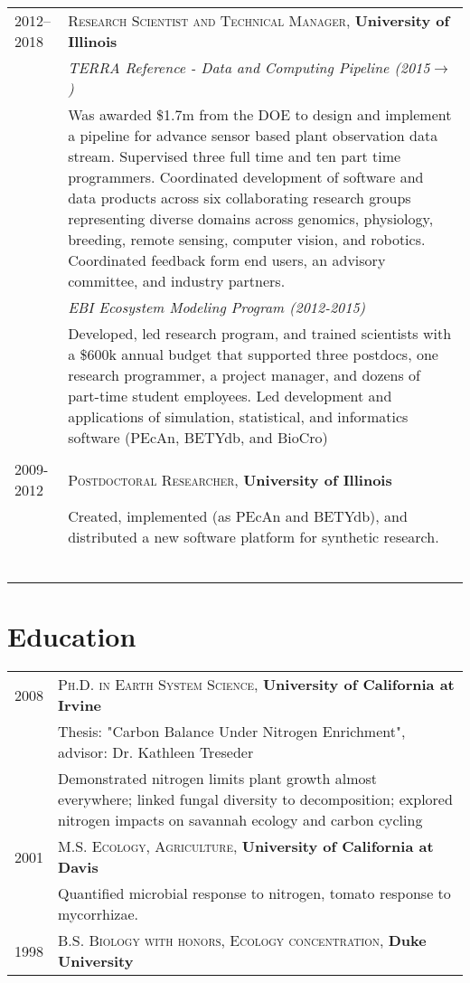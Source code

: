 \documentclass[a4paper,10pt]{article}
\begin{document}
\begin{tabular}{lp{11cm}}
2012--2018 & \textsc{Research Scientist and Technical Manager},  \textbf{University of Illinois} \\
& \small \emph{TERRA Reference - Data and Computing Pipeline (2015$\rightarrow$)}\\
&\footnotesize{Was awarded \$1.7m from the DOE %
to design and implement a pipeline for advance sensor based plant observation data stream. Supervised three full time and ten part time programmers. Coordinated development of software and data products across six collaborating research groups representing diverse domains across genomics, physiology, breeding, remote sensing, computer vision, and robotics. Coordinated feedback form end users, an advisory committee, and industry partners.
}\\
 & \emph{EBI Ecosystem Modeling Program (2012-2015)}\\
& \footnotesize{Developed, led research program, and trained scientists with a \$600k annual budget that supported three postdocs, one research programmer, a project manager, and dozens of part-time student employees. Led development and applications of simulation, statistical, and informatics software (PEcAn, BETYdb, and BioCro)}\\
\multicolumn{2}{c}{} \\
2009-2012 & \textsc{Postdoctoral Researcher}, \textbf{University of Illinois}\\
& \footnotesize{Created, implemented (as PEcAn and BETYdb), and distributed a new software platform for synthetic research.}\\\
\textsc{} & \\
\multicolumn{2}{c}{} \\


\end{tabular}


\section{Education}
\begin{tabular}{rp{11cm}}	
2008 & \textsc{Ph.D. in Earth System Science}, \textbf{University of California at Irvine}\\
& \small Thesis: "Carbon Balance Under Nitrogen Enrichment", advisor: Dr. Kathleen Treseder\\
&\small Demonstrated nitrogen limits plant growth almost everywhere; linked fungal diversity to decomposition; explored nitrogen impacts on savannah ecology and carbon cycling\\
 2001 & \textsc{M.S. Ecology, Agriculture}, \textbf{University of California at Davis} \\
 &\small Quantified microbial response to nitrogen, tomato response to mycorrhizae.\\
1998 & \textsc{B.S. Biology with honors, Ecology concentration}, \textbf{Duke University} \\
\end{tabular}
\end{document}
